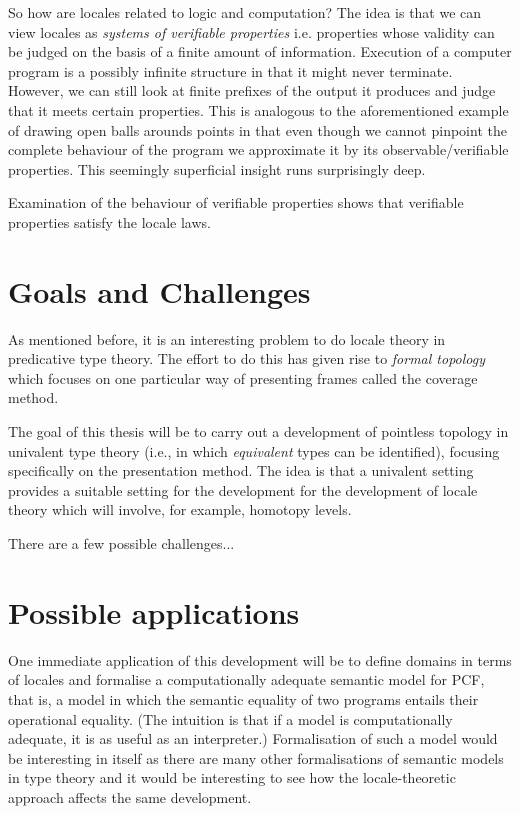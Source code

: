 \documentclass{article}
\begin{document}
So how are locales related to logic and computation? The idea is that we can view locales
as \emph{systems of verifiable properties} i.e. properties whose validity can be judged on
the basis of a finite amount of information. Execution of a computer program is a possibly
infinite structure in that it might never terminate. However, we can still look at finite
prefixes of the output it produces and judge that it meets certain properties. This is
analogous to the aforementioned example of drawing open balls arounds points in that even
though we cannot pinpoint the complete behaviour of the program we approximate it by its
observable/verifiable properties. This seemingly superficial insight runs surprisingly
deep.

Examination of the behaviour of verifiable properties shows that verifiable properties
satisfy the locale laws.

\section{Goals and Challenges}

As mentioned before, it is an interesting problem to do locale theory in predicative type
theory. The effort to do this has given rise to \emph{formal topology} which focuses on
one particular way of presenting frames called the coverage method.

The goal of this thesis will be to carry out a development of pointless topology in
univalent type theory (i.e., in which \emph{equivalent} types can be identified), focusing
specifically on the presentation method. The idea is that a univalent setting provides a
suitable setting for the development for the development of locale theory which will
involve, for example, homotopy levels.

There are a few possible challenges...


\section{Possible applications}

One immediate application of this development will be to define domains in terms of
locales and formalise a computationally adequate semantic model for PCF, that is, a model
in which the semantic equality of two programs entails their operational equality. (The
intuition is that if a model is computationally adequate, it is as useful as an
interpreter.) Formalisation of such a model would be interesting in itself as there are
many other formalisations of semantic models in type theory and it would be interesting to
see how the locale-theoretic approach affects the same development.
\end{document}
